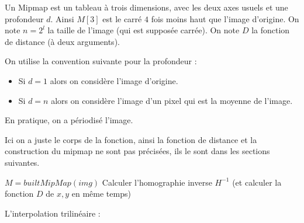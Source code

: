 

Un Mipmap est un tableau à trois dimensions, avec les deux axes usuels et une profondeur $d$.
Ainsi $M[3]$ est le carré $4$ fois moins haut que l'image d'origine. On note $n=2^l$ la taille de l'image (qui est supposée carrée). On note $D$ la fonction de distance (à deux arguments).

On utilise la convention suivante pour la profondeur : 
\begin{itemize}
\item Si $d = 1$ alors on considère l'image d'origine.
\item Si $d = n$ alors on considère l'image d'un pixel qui est la moyenne de l'image.
\end{itemize}

En pratique, on a périodisé l'image.


Ici on a juste le corps de la fonction, ainsi la fonction de distance et la construction du mipmap ne sont pas précisées, ils le sont dans les sections suivantes.
\medbreak
\medbreak
\begin{algorithm}[H]
\caption{$mainFunction(img,H,img_f)$}
$M=builtMipMap(img)$ \;%
Calculer l'homographie inverse $H^{-1}$ (et calculer la fonction $D$ de $x,y$ en même temps)\;
\end{algorithm}

\medbreak
\medbreak
L'interpolation trilinéaire :
\medbreak
\medbreak

\begin{algorithm}[H]
\caption{$evalPixel((u,v),d,M)$}

\end{algorithm}

